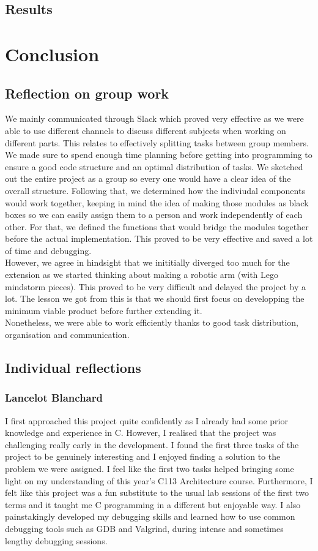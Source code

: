\documentclass[11pt]{article}
\begin{document}
\subsection{Results}
\section{Conclusion}
\subsection{Reflection on group work}
We mainly communicated through Slack which proved very effective as we were able
to use different channels to discuss different subjects when working on
different parts. This relates to effectively splitting tasks between group
members. We made sure to spend enough time planning before getting into
programming to ensure a good code structure and an optimal distribution of
tasks. We sketched out the entire project as a group so every one would have a
clear idea of the overall structure. Following that, we determined how the
indiviudal components would work together, keeping in mind the idea of making
those modules as black boxes so we can easily assign them to a person and work
independently of each other. For that, we defined the functions that would
bridge the modules together before the actual implementation. This proved to be
very effective and saved a lot of time and debugging.\\
However, we agree in hindsight that we inititially diverged too much for the
extension as we started thinking about making a robotic arm (with Lego mindstorm
pieces). This proved to be very difficult and delayed the project by a lot. The
lesson we got from this is that we should first focus on developping the minimum
viable product before further extending it.\\
Nonetheless, we were able to work efficiently thanks to good task distribution,
organisation and communication.

\subsection{Individual reflections}
\subsubsection{Lancelot Blanchard}
I first approached this project quite confidently as I already had some prior knowledge 
and experience in C. However, I realised that the project was challenging really early in 
the development. I found the first three tasks of the project to be genuinely interesting 
and I enjoyed finding a solution to the problem we were assigned. I feel like the first two 
tasks helped bringing some light on my understanding of this year's C113 Architecture course. 
Furthermore, I felt like this project was a fun substitute to the usual lab sessions of the 
first two terms and it taught me C programming in a different but enjoyable way. I also 
painstakingly developed my debugging skills and learned how to use common debugging tools such 
as GDB and Valgrind, during intense and sometimes lengthy debugging sessions. 
\end{document}
